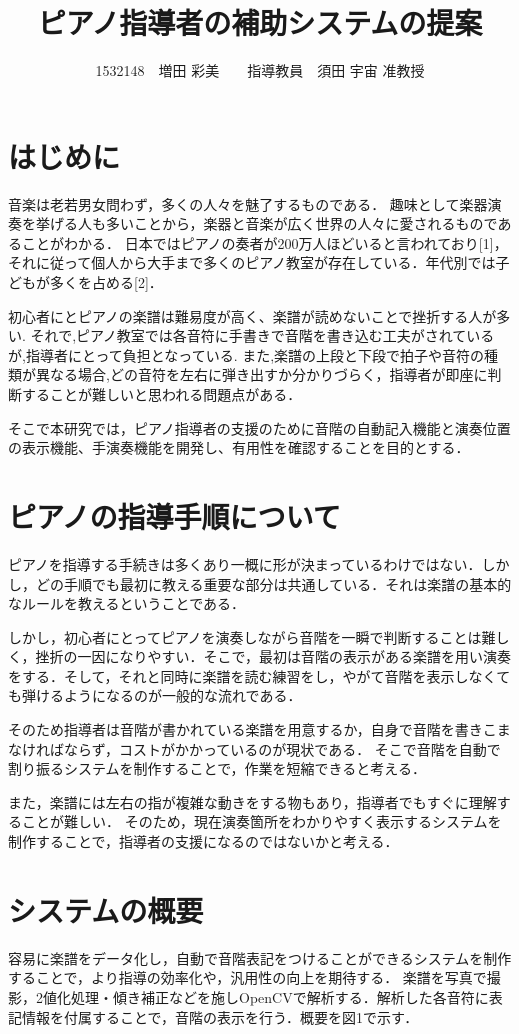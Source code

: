 \documentclass[twocolumn,10pt,a4j]{jsarticle}
\title{ピアノ指導者の補助システムの提案}
\author{1532148　増田 彩美　　指導教員　須田 宇宙 准教授}
\date{}
\begin{document}
\maketitle

\section{はじめに}

音楽は老若男女問わず，多くの人々を魅了するものである．
趣味として楽器演奏を挙げる人も多いことから，楽器と音楽が広く世界の人々に愛されるものであることがわかる．
日本ではピアノの奏者が200万人ほどいると言われており[1]，それに従って個人から大手まで多くのピアノ教室が存在している．年代別では子どもが多くを占める[2]．

初心者にとピアノの楽譜は難易度が高く、楽譜が読めないことで挫折する人が多い.
それで,ピアノ教室では各音符に手書きで音階を書き込む工夫がされているが,指導者にとって負担となっている.
また,楽譜の上段と下段で拍子や音符の種類が異なる場合,どの音符を左右に弾き出すか分かりづらく，指導者が即座に判断することが難しいと思われる問題点がある．

そこで本研究では，ピアノ指導者の支援のために音階の自動記入機能と演奏位置の表示機能、手演奏機能を開発し、有用性を確認することを目的とする．


\section{ピアノの指導手順について}
ピアノを指導する手続きは多くあり一概に形が決まっているわけではない．しかし，どの手順でも最初に教える重要な部分は共通している．それは楽譜の基本的なルールを教えるということである．

しかし，初心者にとってピアノを演奏しながら音階を一瞬で判断することは難しく，挫折の一因になりやすい．そこで，最初は音階の表示がある楽譜を用い演奏をする．そして，それと同時に楽譜を読む練習をし，やがて音階を表示しなくても弾けるようになるのが一般的な流れである．

そのため指導者は音階が書かれている楽譜を用意するか，自身で音階を書きこまなければならず，コストがかかっているのが現状である．
そこで音階を自動で割り振るシステムを制作することで，作業を短縮できると考える．

また，楽譜には左右の指が複雑な動きをする物もあり，指導者でもすぐに理解することが難しい．
そのため，現在演奏箇所をわかりやすく表示するシステムを制作することで，指導者の支援になるのではないかと考える．

\section{システムの概要}
容易に楽譜をデータ化し，自動で音階表記をつけることができるシステムを制作することで，より指導の効率化や，汎用性の向上を期待する．
楽譜を写真で撮影，2値化処理・傾き補正などを施しOpenCVで解析する．解析した各音符に表記情報を付属することで，音階の表示を行う．概要を図1で示す．
\end{document}
